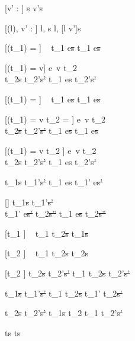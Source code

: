 [v' : \tau]
  { }
  {\Fill \tau\st{s}  \Edit v'\st{s}}

[\Sigma(l), v' : \tau]
  { }
{\Change l, s  \Change l, [l \mapsto v']s}

[\Observe(t_1) = \nothing]
  {\ }
  {t_1 \Next e\st{s} \handle{\Continue} t_1 \Next e\st{s}}

[\Observe(t_1) = v]
  {e\ v \evaluate t_2    \\
   t_2\st{s} \normalise t_2'\st{s'} }
  {t_1 \Next e\st{s} \handle{\Continue} t_2'\st{s'}}

[\Observe(t_1) = \nothing]
  {\ }
  {t_1 \Then e\st{s} \handle{\Execute \pi} t_1 \Then e\st{s}}

[\Observe(t_1) = v \land t_2 = \Fail]
  {e\ v \evaluate t_2    \\
   t_2\st{s} \handle{\Pick \pi} t_2'\st{s'} }
  {t_1 \Then e\st{s} \handle{\Execute \pi} t_1 \Then e\st{s}}

[\Observe(t_1) = v \land t_2 \neq \Fail]
  {e\ v \evaluate t_2    \\
   t_2\st{s} \handle{\Pick \pi} t_2'\st{s'} }
  {t_1 \Then e\st{s} \handle{\Execute \pi} t_2'\st{s'}}

  {t_1\st{s} \handle{\eta} t_1'\st{s'}}
  {t_1 \Next e\st{s} \handle{\eta} t_1' \Next e\st{s'}}

[\eta \neq \Execute \pi]
  {t_1\st{s} \handle{\eta} t_1'\st{s'}       \\
   t_1' \Then e\st{s'} \normalise t_2\st{s''} }
  {t_1 \Then e\st{s} \handle{\eta} t_2\st{s''}}

[t_1 \neq \Fail]
  {\ }
  {t_1 \One t_2\st{s} \handle{\Pick \First} t_1\st{s}}

[t_2 \neq \Fail]
  {\ }
  {t_1 \One t_2\st{s} \handle{\Pick \Second} t_2\st{s}}

[t_2 \neq \Fail]
  {t_2\st{s} \handle{\Pick \pi} t_2'\st{s'}}
  {t_1 \One t_2\st{s} \handle{\Pick \Other \pi} t_2'\st{s'}}

  {t_1\st{s} \handle{\eta} t_1'\st{s'} }
  {t_1 \AndOr t_2\st{s} \handle{\Left \eta} t_1' \AndOr t_2\st{s'}}

  {t_2\st{s} \handle{\eta} t_2'\st{s'} }
  {t_1\st{s} \AndOr t_2 \handle{\Right \eta} t_1 \AndOr t_2'\st{s'}}

  { }
  {t\st{s} \handle{\eta} t\st{s}}
